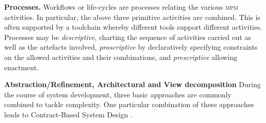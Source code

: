 \noindent
\textbf{Processes.} Workflows or life-cycles are processes relating the various \textsc{mpm} activities.
In particular, the above three primitive activities are combined. This is often supported by
a toolchain whereby different tools support different activities.
%
Processes may be \emph{descriptive}, charting the sequence of activities carried out
as well as the artefacts involved, \emph{proscriptive} by declaratively 
specifying constraints on the allowed activities and their combinations,
and \emph{prescriptive} allowing enactment.

\noindent
\textbf{Abstraction/Refinement, Architectural and View decomposition} 
During the course of system development, three basic approaches are commonly combined to tackle 
complexity. One particular combination of these approaches leads to Contract-Based System Design  \cite{SystemDesignContracts}.

